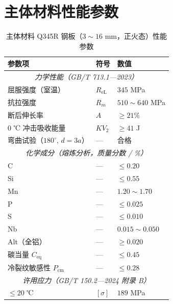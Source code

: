 \section{主体材料性能参数}
\label{sec:cad-material}

\begin{table}[htbp]
  \centering
  \caption{主体材料 Q345R 钢板（$3\sim16$ mm，正火态）性能参数}
  \label{tab:cad-q345r-full}
  \small\renewcommand{\arraystretch}{1.1}
  \setlength{\tabcolsep}{6pt}
  \begin{tabularx}{\textwidth}{@{}l l l @{}}
    \toprule
    \textbf{参数项} & \textbf{符号} & \textbf{数值} \\
    \midrule
    \multicolumn{3}{c}{\textit{力学性能（GB/T 713.1—2023）}} \\
    \midrule
    屈服强度（室温）           & $R_{\text{eL}}$   & $345$ MPa \\
    抗拉强度                   & $R_m$             & $510\sim640$ MPa \\
    断后伸长率                 & $A$               & $\ge 21\%$ \\
    $0$ ℃ 冲击吸收能量        & $KV_2$            & $\ge 41$ J \\
    弯曲试验（$180^\circ$, $d=3a$） & —             & 合格 \\
    \midrule
    \multicolumn{3}{c}{\textit{化学成分（熔炼分析，质量分数 / \%）}} \\
    \midrule
    C                          & —                 & $\le 0.20$ \\
    Si                         & —                 & $\le 0.55$ \\
    Mn                         & —                 & $1.20\sim1.70$ \\
    P                          & —                 & $\le 0.025$ \\
    S                          & —                 & $\le 0.010$ \\
    Nb                         & —                 & $0.015\sim0.050$ \\
    Alt（全铝）                & —                 & $\ge 0.020$ \\
    碳当量 $C_{\text{eq}}$    & —                 & $\le 0.45$ \\
    冷裂纹敏感性 $P_{\text{cm}}$ & —               & $\le 0.28$ \\
    \midrule
    \multicolumn{3}{c}{\textit{许用应力（GB/T 150.2—2024 附录 B）}} \\
    \midrule
    $\le 20$ ℃                & $[\sigma]$        & $189$ MPa \\

\end{tabularx}
\end{table}
